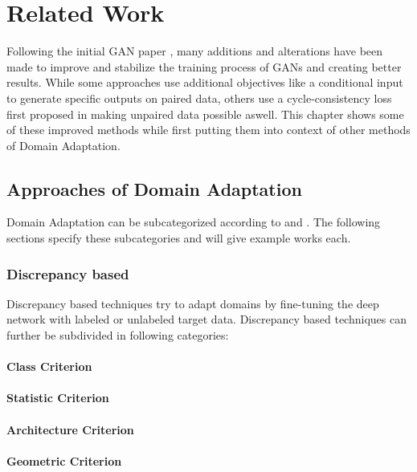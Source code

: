 \chapter{Related Work}
\label{sec:related_work}
Following the initial GAN paper \cite{NIPS2014_5423}, many additions and alterations have been made to improve and stabilize the training process of GANs and creating better results. While some approaches use additional objectives like a conditional input to generate specific outputs \cite{DBLP:journals/corr/IsolaZZE16} on paired data, others use a cycle-consistency loss first proposed in \cite{DBLP:journals/corr/ZhuPIE17} making unpaired data possible aswell. This chapter shows some of these improved methods while first putting them into context of other methods of Domain Adaptation. 

\section{Approaches of Domain Adaptation}
Domain Adaptation can be subcategorized according to \cite{DBLP:journals/corr/Csurka17} and \cite{DBLP:journals/corr/abs-1802-03601}. The following sections specify these subcategories and will give example works each.

\subsection{Discrepancy based}
Discrepancy based techniques try to adapt domains by fine-tuning the deep network with labeled or unlabeled target data. Discrepancy based techniques can further be subdivided in following categories:
\subsubsection{Class Criterion}

\subsubsection{Statistic Criterion}

\subsubsection{Architecture Criterion}

\subsubsection{Geometric Criterion}

